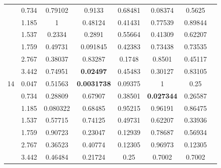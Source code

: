 \begin{table}[H]
\begin{center}
\begin{tabular}{cccccccc}
    &          0.734&          0.79102&          0.9133&          0.68481&          0.08374&          0.5625 \\
    &          1.185&          1&          0.48124&          0.41431&          0.77539&          0.89844 \\
    &          1.537&          0.2334&          0.2891&          0.55664&          0.41309&          0.62207 \\
    &          1.759&          0.49731&          0.091845&          0.42383&          0.73438&          0.73535 \\
    &          2.767&          0.38037&          0.83287&          0.1748&          0.8501&          0.45117 \\
    &          3.442&          0.74951&          \textbf{0.02497} &          0.45483&          0.30127&          0.83105 \\
  14&          0.047&          0.51563&          \textbf{0.0031738}&          0.09375&          1&          0.25 \\
    &          0.734&          0.28809&          0.67907&          0.38501&          \textbf{0.027344}&          0.26587 \\
    &          1.185&          0.080322&          0.68485&          0.95215&          0.96191&          0.86475 \\
    &          1.537&          0.57715&          0.74125&          0.49731&          0.62207&          0.33936 \\
    &          1.759&          0.90723&          0.23047&          0.12939&          0.78687&          0.56934 \\
    &          2.767&          0.36523&          0.40774&          0.12305&          0.96973&          0.12305 \\
    &          3.442&          0.46484&          0.21724&          0.25&          0.7002&          0.7002 \\
      \bottomrule
    \end{tabular}
  \end{center}
\end{table}


